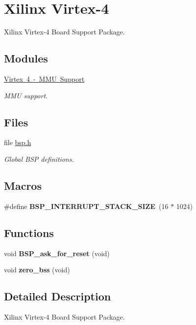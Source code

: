 \hypertarget{group__RTEMSBSPsPowerPCVirtex4}{}\section{Xilinx Virtex-\/4}
\label{group__RTEMSBSPsPowerPCVirtex4}


Xilinx Virtex-\/4 Board Support Package.  


\subsection*{Modules}
\begin{DoxyCompactItemize}
\item 
\mbox{\hyperlink{group__Virtex4MMU}{Virtex 4 -\/ M\+M\+U Support}}
\begin{DoxyCompactList}\small\item\em M\+MU support. \end{DoxyCompactList}\end{DoxyCompactItemize}
\subsection*{Files}
\begin{DoxyCompactItemize}
\item 
file \mbox{\hyperlink{bsps_2powerpc_2virtex4_2include_2bsp_8h}{bsp.\+h}}
\begin{DoxyCompactList}\small\item\em Global B\+SP definitions. \end{DoxyCompactList}\end{DoxyCompactItemize}
\subsection*{Macros}
\begin{DoxyCompactItemize}
\item 
\mbox{\label{group__RTEMSBSPsPowerPCVirtex4_gaae9597381ef6e8194012ad0c6168cf79}} 
\#define {\bfseries B\+S\+P\+\_\+\+I\+N\+T\+E\+R\+R\+U\+P\+T\+\_\+\+S\+T\+A\+C\+K\+\_\+\+S\+I\+ZE}~(16 $\ast$ 1024)
\end{DoxyCompactItemize}
\subsection*{Functions}
\begin{DoxyCompactItemize}
\item 
\mbox{\label{group__RTEMSBSPsPowerPCVirtex4_gaf29d6f154e6df205a41b7196b6eac0b8}} 
void {\bfseries B\+S\+P\+\_\+ask\+\_\+for\+\_\+reset} (void)
\item 
\mbox{\label{group__RTEMSBSPsPowerPCVirtex4_gaa1c249f197a325121cc9678b1665c29b}} 
void {\bfseries zero\+\_\+bss} (void)
\end{DoxyCompactItemize}


\subsection{Detailed Description}
Xilinx Virtex-\/4 Board Support Package. 

